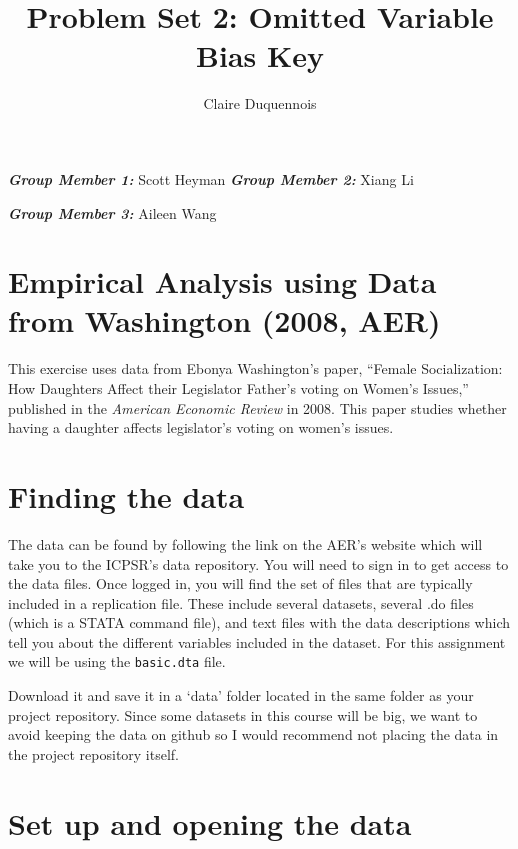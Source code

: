 \documentclass[
]{article}
\title{Problem Set 2: Omitted Variable Bias Key}
\author{Claire Duquennois}
\date{}
\begin{document}
\maketitle

\textbf{\emph{Group Member 1:}} Scott Heyman \textbf{\emph{Group Member
2:}} Xiang Li

\textbf{\emph{Group Member 3:}} Aileen Wang

\hypertarget{empirical-analysis-using-data-from-washington-2008-aer}{%
\section{Empirical Analysis using Data from Washington (2008,
AER)}\label{empirical-analysis-using-data-from-washington-2008-aer}}

This exercise uses data from Ebonya Washington's paper, ``Female
Socialization: How Daughters Affect their Legislator Father's voting on
Women's Issues,'' published in the \emph{American Economic Review} in
2008. This paper studies whether having a daughter affects legislator's
voting on women's issues.

\hypertarget{finding-the-data}{%
\section{Finding the data}\label{finding-the-data}}

The data can be found by following the link on the AER's website which
will take you to the ICPSR's data repository. You will need to sign in
to get access to the data files. Once logged in, you will find the set
of files that are typically included in a replication file. These
include several datasets, several .do files (which is a STATA command
file), and text files with the data descriptions which tell you about
the different variables included in the dataset. For this assignment we
will be using the \texttt{basic.dta} file.

Download it and save it in a `data' folder located in the same folder as
your project repository. Since some datasets in this course will be big,
we want to avoid keeping the data on github so I would recommend not
placing the data in the project repository itself.

\hypertarget{set-up-and-opening-the-data}{%
\section{Set up and opening the
data}\label{set-up-and-opening-the-data}}
\end{document}
